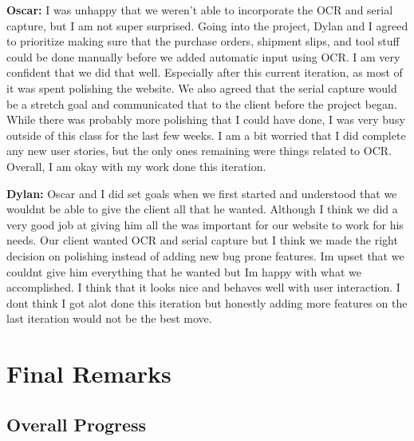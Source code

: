 \documentclass{article}
\begin{document}
\textbf{Oscar:} I was unhappy that we weren't able to incorporate the OCR and serial capture, but I am not super surprised. Going into the project, Dylan and I agreed to prioritize making sure that the purchase orders, shipment slips, and tool stuff could be done manually before we added automatic input using OCR. I am very confident that we did that well. Especially after this current iteration, as most of it was spent polishing the website. We also agreed that the serial capture would be a stretch goal and communicated that to the client before the project began. While there was probably more polishing that I could have done, I was very busy outside of this class for the last few weeks. I am a bit worried that I did complete any new user stories, but the only ones remaining were things related to OCR. Overall, I am okay with my work done this iteration.

\textbf{Dylan:} Oscar and I did set goals when we first started and understood that we wouldnt be able to give the client all that he wanted. Although I think we did a very good job at giving him all the was important for our website to work for his needs. Our client wanted OCR and serial capture but I think we made the right decision on polishing instead of adding new bug prone features. Im upset that we couldnt give him everything that he wanted but Im happy with what we accomplished. I think that it looks nice and behaves well with user interaction. I dont think I got alot done this iteration but honestly adding more features on the last iteration would not be the best move.

\section{Final Remarks}

\subsection{Overall Progress}
\end{document}
